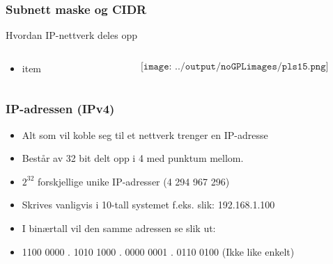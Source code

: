 \documentclass[aspectratio=169,xcolor=dvipsnames]{beamer}
\begin{document}
\begin{frame}
	\frametitle{Subnett maske og CIDR}%
	Hvordan IP-nettverk deles opp

	\begin{columns}
		\begin{column}{0.5\textwidth}
			\begin{itemize}
				\item item
			\end{itemize}

			
		\end{column}

		\begin{column}{0.5\textwidth}
	$$\texttt{[image: ../output/noGPLimages/pls15.png]}$$
		\end{column}
	\end{columns}
\end{frame}
\begin{frame}
	\frametitle{IP-adressen (IPv4)}
			\begin{itemize}
				\item Alt som vil koble seg til et nettverk trenger en IP-adresse
				\item Består av 32 bit delt opp i 4 med punktum mellom.
				\item $2^{32}$ forskjellige unike IP-adresser (4 294 967 296)
				\item Skrives vanligvis i 10-tall systemet f.eks. slik: 192.168.1.100
				\item I binærtall vil den samme adressen se slik ut:
				\item 1100 0000 . 1010 1000 . 0000 0001 . 0110 0100 (Ikke like enkelt)
			\end{itemize}

			
\end{frame}
\end{document}
